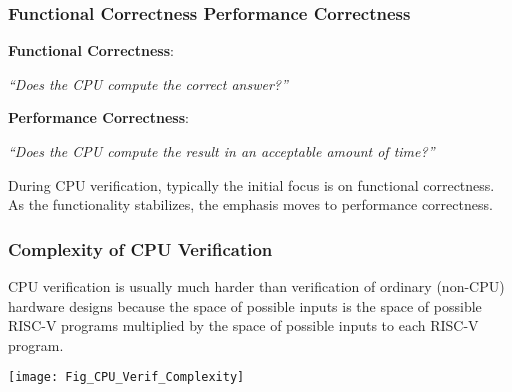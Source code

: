 \begin{frame}[fragile]
\frametitle{Functional Correctness {\vs} Performance Correctness}

\footnotesize

{\bf Functional Correctness}:

\vx

\hmmmm \emph{``Does the CPU compute the correct answer?''}

\vxxxx

{\bf Performance Correctness}:

\vx

\hmmmm \emph{``Does the CPU compute the result in an acceptable amount of time?''}

\vxxxx

During CPU verification, typically the initial focus is on functional
correctness.  As the functionality stabilizes, the emphasis moves to
performance correctness.

\end{frame}


\begin{frame}[fragile]
\frametitle{Complexity of CPU Verification}

\footnotesize

CPU verification is usually much harder than verification of ordinary
(non-CPU) hardware designs because the space of possible inputs is the
space of possible RISC-V programs multiplied by the space of possible
inputs to each RISC-V program.

\vxxxx

\begin{center}
  \begin{minipage}{0.7\textwidth}
    \texttt{[image: Fig\_CPU\_Verif\_Complexity]}
  \end{minipage}
\end{center}

\end{frame}


